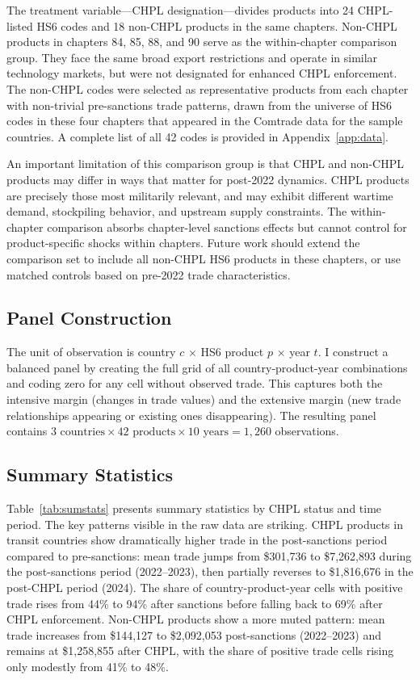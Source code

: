 \documentclass[12pt]{article}
\begin{document}
The treatment variable---CHPL designation---divides products into 24 CHPL-listed HS6 codes and 18 non-CHPL products in the same chapters. Non-CHPL products in chapters 84, 85, 88, and 90 serve as the within-chapter comparison group. They face the same broad export restrictions and operate in similar technology markets, but were not designated for enhanced CHPL enforcement. The non-CHPL codes were selected as representative products from each chapter with non-trivial pre-sanctions trade patterns, drawn from the universe of HS6 codes in these four chapters that appeared in the Comtrade data for the sample countries. A complete list of all 42 codes is provided in Appendix~\ref{app:data}.

An important limitation of this comparison group is that CHPL and non-CHPL products may differ in ways that matter for post-2022 dynamics. CHPL products are precisely those most militarily relevant, and may exhibit different wartime demand, stockpiling behavior, and upstream supply constraints. The within-chapter comparison absorbs chapter-level sanctions effects but cannot control for product-specific shocks within chapters. Future work should extend the comparison set to include all non-CHPL HS6 products in these chapters, or use matched controls based on pre-2022 trade characteristics.

\subsection{Panel Construction}

The unit of observation is country $c$ $\times$ HS6 product $p$ $\times$ year $t$. I construct a balanced panel by creating the full grid of all country-product-year combinations and coding zero for any cell without observed trade. This captures both the intensive margin (changes in trade values) and the extensive margin (new trade relationships appearing or existing ones disappearing). The resulting panel contains $3 \text{ countries} \times 42 \text{ products} \times 10 \text{ years} = 1{,}260$ observations.

\subsection{Summary Statistics}



Table~\ref{tab:sumstats} presents summary statistics by CHPL status and time period. The key patterns visible in the raw data are striking. CHPL products in transit countries show dramatically higher trade in the post-sanctions period compared to pre-sanctions: mean trade jumps from \$301,736 to \$7,262,893 during the post-sanctions period (2022--2023), then partially reverses to \$1,816,676 in the post-CHPL period (2024). The share of country-product-year cells with positive trade rises from 44\% to 94\% after sanctions before falling back to 69\% after CHPL enforcement. Non-CHPL products show a more muted pattern: mean trade increases from \$144,127 to \$2,092,053 post-sanctions (2022--2023) and remains at \$1,258,855 after CHPL, with the share of positive trade cells rising only modestly from 41\% to 48\%.
\end{document}
